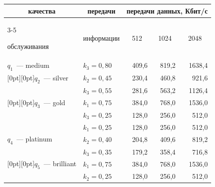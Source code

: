 \begin{table}
\begin{center}
\begin{tabular}{|l|l|r|r|r|}
\multicolumn{1}{|c|}{качества }&\multicolumn{1}{c|}{передачи} 


&\multicolumn{3}{c|}{передачи данных, Кбит/\!с}\\


\cline{3-5}


обслуживания&\multicolumn{1}{c|}{информации}&


\multicolumn{1}{c|}{512}&\multicolumn{1}{c|}{1024}&\multicolumn{1}{c|}{2048}\\


\hline


$q_1$~--- medium&$k_3 = 0{,}80$&409,6&819,2&1638,4\\


\hline


\multicolumn{1}{|l|}{\raisebox{-6pt}[0pt][0pt]{$q_2$~--- silver}}&$k_2 = 0{,}45$&230,4&460,8&921,6\\


&$k_3 = 0{,}55$&281,6&563,2&1126,4\\


\hline


\multicolumn{1}{|l|}{\raisebox{-6pt}[0pt][0pt]{$q_3$~--- gold}}&$k_1 = 0{,}75$&384,0&768,0&1536,0\\


&$k_3 = 0{,}25$&128,0&256,0&512,0\\


\hline


&$k_1 = 0{,}25$&128,0&256,0&512,0\\


$q_4$~--- platinum&$k_2 = 0{,}40$&204,8&409,6&819,2\\


&$k_3 = 0{,}35$&179,2&358,4&716,8\\


\hline


\multicolumn{1}{|l|}{\raisebox{-6pt}[0pt][0pt]{$q_5$~--- brilliant}}&$k_1 = 0{,}75$&384,0&768,0&1536,0\\


&$k_2 = 0{,}25$&128,0&256,0&512,0\\


\hline


\end{tabular}


\end{center}


\vspace*{-12pt}


\end{table}


